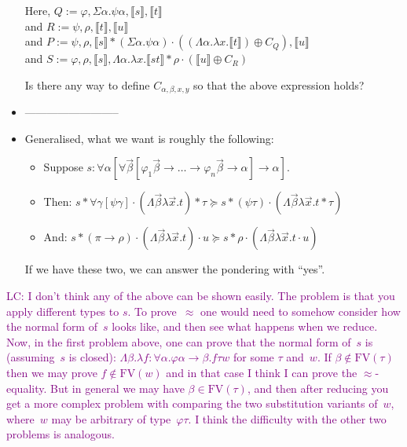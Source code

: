 \documentclass[runningheads,a4paper]{llncs}
\newcommand{\interpret}[1]{\llbracket #1 \rrbracket}
\newcommand{\arrtype}{\rightarrow}
\newcommand{\FV}{\mathrm{FV}}
\newcommand{\LC}[1]{\textcolor{purple}{LC: #1}}
\begin{document}
\begin{itemize}
  Here, $Q := \varphi,\Sigma\alpha.\psi\alpha,\interpret{s},\interpret{t}$ \\
  and $R := \psi,\rho,\interpret{t},\interpret{u}$ \\
  and $P :=\psi,\rho,\interpret{s} * (\Sigma \alpha.\psi\alpha) \cdot ((\Lambda \alpha.\lambda x.\interpret{t}) \oplus C_Q),\interpret{u}$ \\
  and $S := \varphi,\rho,\interpret{s},\Lambda \alpha.\lambda x.\interpret{st} * \rho \cdot (\interpret{u} \oplus C_R)$ \

  Is there any way to define $C_{\alpha,\beta,x,y}$ so that the above expression holds?
\item --------------------------
\item Generalised, what we want is roughly the following:
  \begin{itemize}
  \item Suppose $s : \forall \alpha [ \forall \vec{\beta} [\varphi_1\vec{\beta} \arrtype \dots \arrtype \varphi_n\vec{\beta} \arrtype \alpha] \arrtype \alpha]$.
  \item Then: $s * \forall \gamma [\psi\gamma] \cdot (\Lambda \vec{\beta} \lambda \vec{x}.t) * \tau \succeq s * (\psi\tau) \cdot (\Lambda \vec{\beta} \lambda \vec{x}.t * \tau)$
  \item And: $s * (\pi \arrtype \rho) \cdot (\Lambda \vec{\beta} \lambda \vec{x}.t) \cdot u \succeq s * \rho \cdot (\Lambda \vec{\beta} \lambda \vec{x}.t \cdot u)$
  \end{itemize}
  If we have these two, we can answer the pondering with ``yes''.
\end{itemize}

\LC{I don't think any of the above can be shown easily. The problem is
  that you apply different types to $s$. To prove~$\approx$ one would
  need to somehow consider how the normal form of~$s$ looks like, and
  then see what happens when we reduce. Now, in the first problem
  above, one can prove that the normal form of~$s$ is (assuming~$s$ is
  closed): $\Lambda \beta . \lambda f : \forall \alpha . \varphi
  \alpha \to \beta . f \tau w$ for some $\tau$ and~$w$. If $\beta
  \notin \FV(\tau)$ then we may prove $f \notin \FV(w)$ and in that
  case I think I can prove the $\approx$-equality. But in general we
  may have $\beta \in \FV(\tau)$, and then after reducing you get a
  more complex problem with comparing the two substitution variants
  of~$w$, where~$w$ may be arbitrary of type~$\varphi \tau$. I think
  the difficulty with the other two problems is analogous.}
\end{document}
